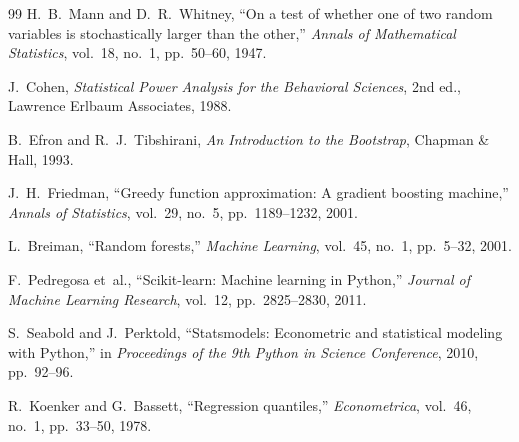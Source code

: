 \begin{thebibliography}{99}
H.~B.~Mann and D.~R.~Whitney, ``On a test of whether one of two random
variables is stochastically larger than the other,'' \emph{Annals of
Mathematical Statistics}, vol.~18, no.~1, pp.~50--60, 1947.

J.~Cohen, \emph{Statistical Power Analysis for the Behavioral Sciences},
2nd ed., Lawrence Erlbaum Associates, 1988.

B.~Efron and R.~J.~Tibshirani, \emph{An Introduction to the Bootstrap},
Chapman \& Hall, 1993.

J.~H.~Friedman, ``Greedy function approximation: A gradient boosting
machine,'' \emph{Annals of Statistics}, vol.~29, no.~5, pp.~1189--1232, 2001.

L.~Breiman, ``Random forests,'' \emph{Machine Learning}, vol.~45, no.~1,
pp.~5--32, 2001.

F.~Pedregosa et~al., ``Scikit-learn: Machine learning in Python,''
\emph{Journal of Machine Learning Research}, vol.~12, pp.~2825--2830, 2011.

S.~Seabold and J.~Perktold, ``Statsmodels: Econometric and statistical
modeling with Python,'' in \emph{Proceedings of the 9th Python in Science
Conference}, 2010, pp.~92--96.

R.~Koenker and G.~Bassett, ``Regression quantiles,'' \emph{Econometrica},
vol.~46, no.~1, pp.~33--50, 1978.

\end{thebibliography}
